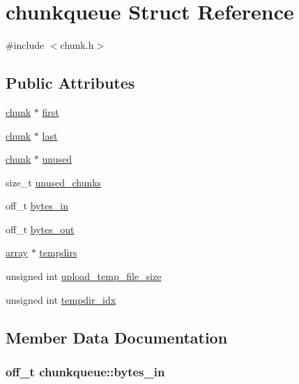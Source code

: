 \hypertarget{structchunkqueue}{\section{chunkqueue Struct Reference}
\label{structchunkqueue}
}


{\ttfamily \#include $<$chunk.\-h$>$}

\subsection*{Public Attributes}
\begin{DoxyCompactItemize}
\item 
\hyperlink{structchunk}{chunk} $\ast$ \hyperlink{structchunkqueue_ad6e42e51e2c86f6c50188fad0dd037ab}{first}
\item 
\hyperlink{structchunk}{chunk} $\ast$ \hyperlink{structchunkqueue_a17696b40547c499d7aedec5e7025feb8}{last}
\item 
\hyperlink{structchunk}{chunk} $\ast$ \hyperlink{structchunkqueue_ab5539b69a2b6b74f002664afbf06411b}{unused}
\item 
size\-\_\-t \hyperlink{structchunkqueue_a9eefb89b6829173ec5f5dffaca172834}{unused\-\_\-chunks}
\item 
off\-\_\-t \hyperlink{structchunkqueue_aa3f38c056ce8f0f8c5e1073f55210969}{bytes\-\_\-in}
\item 
off\-\_\-t \hyperlink{structchunkqueue_a48642cbb09f469f8eb25a325e630cfef}{bytes\-\_\-out}
\item 
\hyperlink{structarray}{array} $\ast$ \hyperlink{structchunkqueue_a4f9d4ef6fff55acab69a952162f78609}{tempdirs}
\item 
unsigned int \hyperlink{structchunkqueue_a68483cb4b4bee6c1898c6632e8ddd6d5}{upload\-\_\-temp\-\_\-file\-\_\-size}
\item 
unsigned int \hyperlink{structchunkqueue_a27d89bfcf310b4640fae3c84684b24cb}{tempdir\-\_\-idx}
\end{DoxyCompactItemize}


\subsection{Member Data Documentation}
\hypertarget{structchunkqueue_aa3f38c056ce8f0f8c5e1073f55210969}{
\subsubsection[{bytes\-\_\-in}]{\setlength{\rightskip}{0pt plus 5cm}off\-\_\-t chunkqueue\-::bytes\-\_\-in}}\label{structchunkqueue_aa3f38c056ce8f0f8c5e1073f55210969}


